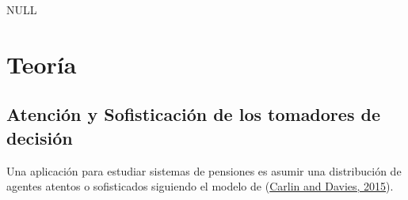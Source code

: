 \documentclass[]{book}
\begin{document}
NULL

\chapter{Teoría}\label{teoria}

\section{Atención y Sofisticación de los tomadores de
decisión}\label{atenciuxf3n-y-sofisticaciuxf3n-de-los-tomadores-de-decisiuxf3n}

Una aplicación para estudiar sistemas de pensiones es asumir una
distribución de agentes atentos o sofisticados siguiendo el modelo de
(\protect\hyperlink{bib-carlin_implementation_2015}{Carlin and Davies,
2015}).


\end{document}
